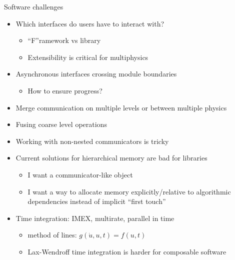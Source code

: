 \documentclass{beamer}
\begin{document}
\begin{frame}{Software challenges}
  \begin{itemize}
  \item Which interfaces do users have to interact with?
    \begin{itemize}
    \item ``F''ramework vs library
    \item Extensibility is critical for multiphysics
    \end{itemize}
  \item Asynchronous interfaces crossing module boundaries
    \begin{itemize}
    \item How to ensure progress?
    \end{itemize}
  \item Merge communication on multiple levels or between multiple physics
  \item Fusing coarse level operations
  \item Working with non-nested communicators is tricky
  \item Current solutions for hierarchical memory are bad for libraries
    \begin{itemize}
    \item I want a communicator-like object
    \item I want a way to allocate memory explicitly/relative to algorithmic dependencies instead of implicit ``first touch''
    \end{itemize}
  \item Time integration: IMEX, multirate, parallel in time
    \begin{itemize}
    \item method of lines: $g(\dot u,u,t) = f(u,t)$
    \item Lax-Wendroff time integration is harder for composable software
    \end{itemize}
  \end{itemize}
\end{frame}
\end{document}
